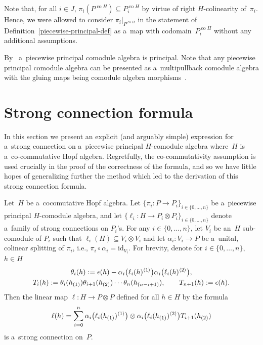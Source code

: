\documentclass[pdftex]{sigma}
\DeclareMathOperator{\co}{co}
\def\sw#1{{\sb{(#1)}}}
\newcommand{\lls}[2]{\ell_{#1}(#2)^{\langle 1\rangle}}
\newcommand{\rrs}[2]{\ell_{#1}(#2)^{\langle 2\rangle}}
\begin{document}
Note that, for all $i\in J$, $\pi_i(P^{\co H})\subseteq P^{\co H}_i$ by virtue of right $H$-colinearity of~$\pi_i$.
Hence, we were allowed to consider $\pi_i\big|_{P^{\co H}}$ in the statement of
Def\/inition~\ref{piecewise-principal-def} as a~map with codomain~$P^{\co H}_i$ without any additional assumptions.

By~\cite[Corollary~3.9]{hkmz11} a~piecewise principal comodule algebra is principal.
Note that any piecewise principal comodule algebra can be presented as a~multipullback comodule algebra with the gluing
maps being comodule algebra morphisms~\cite{cm2002}.

\section{Strong connection formula}\label{strong-section}

In this section we present an explicit (and arguably simple) expression for a~strong connection on a~piecewise
principal $H$-comodule algebra where~$H$ is a~co-commutative Hopf algebra.
Regretfully, the co-commutativity assumption is used crucially in the proof of the correctness of the formula, and so we
have little hopes of generalizing further the method which led to the derivation of this strong connection formula.

\begin{theorem}
\label{Main}
Let~$H$ be a~cocomutative Hopf algebra.
Let $\{\pi_i:P\rightarrow P_i\}_{i\in\{0,\ldots,n\}}$ be a~piecewise principal $H$-comodule algebra, and let
$\{\ell_i:H\rightarrow P_i\otimes P_i\}_{i\in\{0,\ldots,n\}}$ denote a~family of strong connections on $P_i$'s.
For any $i\in\{0,\ldots,n\}$, let $V_i$ be an~$H$ sub-comodule of $P_i$ such that $\ell_i(H)\subseteq V_i\otimes V_i$
and let $\alpha_i:V_i\rightarrow P$ be a~unital, colinear splitting of $\pi_i$, i.e.,
$\pi_i\circ\alpha_i=\mathrm{id}_{V_i}$.
For brevity, denote for $i\in\{0,\ldots,n\}$, $h\in H$
\begin{gather*}
\theta_i(h):={\epsilon}(h)-\alpha_i\big(\lls{i}{h}\big)\alpha_{i}\big(\rrs{i}{h}\big),
\\
T_i(h):=\theta_i(h\sw{1})\theta_{i+1}(h\sw{2})\cdots\theta_n(h\sw{n-i+1}),
\qquad
T_{n+1}(h):={\epsilon}(h).
\end{gather*}
Then the linear map $\ell:H\rightarrow P\otimes P$ defined for all $h\in H$ by the formula
\begin{gather*}
\ell(h)=\sum\limits_{i=0}^n\alpha_i\big(\lls{i}{h\sw{1}}\big)\otimes\alpha_i\big(\rrs{i}{h\sw{1}}\big)T_{i+1}(h\sw{2})
\end{gather*}
is a~strong connection on~$P$.
\end{theorem}
\end{document}
